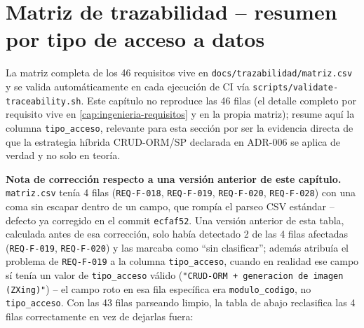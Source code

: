 \section{Matriz de trazabilidad -- resumen por tipo de acceso a datos}
\label{sec:matriz-resumen}

La matriz completa de los 46 requisitos vive en
\texttt{docs/trazabilidad/matriz.csv} y se valida automáticamente en
cada ejecución de CI vía \texttt{scripts/validate-traceability.sh}. Este
capítulo no reproduce las 46 filas (el detalle completo por requisito
vive en \autoref{cap:ingenieria-requisitos} y en la propia matriz);
resume aquí la columna \texttt{tipo\_acceso}, relevante para esta
sección por ser la evidencia directa de que la estrategia híbrida
CRUD-ORM/SP declarada en ADR-006 se aplica de verdad y no solo en
teoría.

\textbf{Nota de corrección respecto a una versión anterior de este
capítulo.} \texttt{matriz.csv} tenía 4 filas
(\texttt{REQ-F-018}, \texttt{REQ-F-019}, \texttt{REQ-F-020},
\texttt{REQ-F-028}) con una coma sin escapar dentro de un campo, que
rompía el parseo CSV estándar -- defecto ya corregido en el commit
\texttt{ecfaf52}. Una versión anterior de esta tabla, calculada antes de
esa corrección, solo había detectado 2 de las 4 filas afectadas
(\texttt{REQ-F-019}, \texttt{REQ-F-020}) y las marcaba como ``sin
clasificar''; además atribuía el problema de \texttt{REQ-F-019} a la
columna \texttt{tipo\_acceso}, cuando en realidad ese campo sí tenía un
valor de \texttt{tipo\_acceso} válido (\texttt{"CRUD-ORM + generacion de
imagen (ZXing)"}) -- el campo roto en esa fila específica era
\texttt{modulo\_codigo}, no \texttt{tipo\_acceso}. Con las 43 filas
parseando limpio, la tabla de abajo reclasifica las 4 filas
correctamente en vez de dejarlas fuera:

